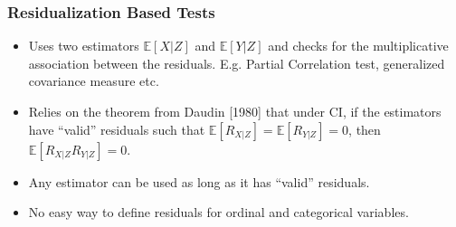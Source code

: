 \documentclass{beamer}
\def\ci{\perp\!\!\!\!\!\perp}
\begin{document}

% 

\begin{frame}
	\frametitle{Residualization Based Tests}
	\begin{itemize}
		\setlength\itemsep{1em}
		\item Uses two estimators $ \mathbb{E}[X| Z] $ and $
			\mathbb{E}[Y | Z] $ and checks for the multiplicative
			association between the residuals. E.g.
			Partial Correlation test, generalized covariance measure etc.
		\item Relies on the theorem from Daudin [1980] \footnotemark 
			that under CI, if the estimators have ``valid'' residuals
			such that $ \mathbb{E}[R_{X|Z}] = \mathbb{E}[R_{Y|Z}] = 0 $,
			then $ \mathbb{E}[R_{X|Z} R_{Y|Z}] = 0 $.
		\item Any estimator can be used as long as it has ``valid'' residuals.
		\item No easy way to define residuals for ordinal and categorical variables.
	\end{itemize}
\end{frame}
\end{document}
